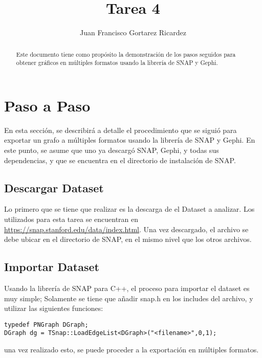 \documentclass[acmsmall]{acmart}
\begin{document}
\title{Tarea 4}


\author{Juan Francisco Gortarez Ricardez}

\renewcommand{\shortauthors}{Juan}

\begin{abstract}
  Este documento tiene como propósito la demonstración de los pasos seguidos para obtener gráficos en múltiples formatos usando la librería de SNAP y Gephi. 
\end{abstract}



\maketitle

\section{Paso a Paso}
En esta sección, se describirá a detalle el procedimiento que se siguió para exportar un grafo a múltiples formatos usando la librería de SNAP y Gephi. En este punto, se asume que uno ya descargó SNAP, Gephi, y todas sus dependencias, y que se encuentra en el directorio de instalación de SNAP.  

\subsection{Descargar Dataset}
Lo primero que se tiene que realizar es la descarga de el Dataset a analizar. Los utilizados para esta tarea se encuentran en \url{https://snap.stanford.edu/data/index.html}. Una vez descargado, el archivo se debe ubicar en el directorio de SNAP, en el mismo nivel que los otros archivos. 

\subsection{Importar Dataset}
Usando la librería de SNAP para C++, el proceso para importar el dataset es muy simple; Solamente se tiene que añadir snap.h en los includes del archivo, y utilizar las siguientes funciones:
\begin{verbatim}
typedef PNGraph DGraph;
DGraph dg = TSnap::LoadEdgeList<DGraph>("<filename>",0,1);
\end{verbatim}
una vez realizado esto, se puede proceder a la exportación en múltiples formatos.
\end{document}
